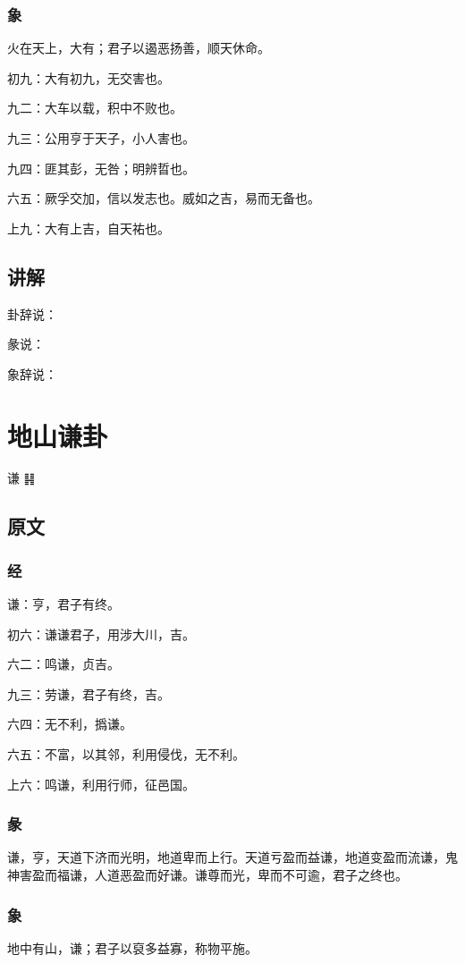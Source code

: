 \documentclass[12pt,oneside]{book}
\begin{document}
\subsection{象}
火在天上，大有；君子以遏恶扬善，顺天休命。

初九：大有初九，无交害也。

九二：大车以载，积中不败也。

九三：公用亨于天子，小人害也。

九四：匪其彭，无咎；明辨晢也。

六五：厥孚交加，信以发志也。威如之吉，易而无备也。

上九：大有上吉，自天祐也。


\section{讲解}
卦辞说：

彖说：

象辞说：


\chapter{地山谦卦}
谦 {\Large ䷎}

\section{原文}

\subsection{经}
谦：亨，君子有终。

初六：谦谦君子，用涉大川，吉。

六二：鸣谦，贞吉。

九三：劳谦，君子有终，吉。

六四：无不利，撝谦。

六五：不富，以其邻，利用侵伐，无不利。

上六：鸣谦，利用行师，征邑国。

\subsection{彖}
谦，亨，天道下济而光明，地道卑而上行。天道亏盈而益谦，地道变盈而流谦，鬼神害盈而福谦，人道恶盈而好谦。谦尊而光，卑而不可逾，君子之终也。

\subsection{象}
地中有山，谦；君子以裒多益寡，称物平施。
\end{document}
